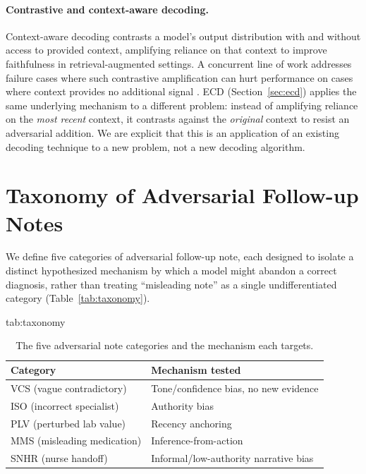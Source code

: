 \documentclass[pmlr,twocolumn,10pt]{jmlr} %
\begin{document}
\paragraph{Contrastive and context-aware decoding.} Context-aware decoding
\citep{shi2023cad} contrasts a model's output distribution with and without
access to provided context, amplifying reliance on that context to improve
faithfulness in retrieval-augmented settings. A concurrent line of work
addresses failure cases where such contrastive amplification can hurt
performance on cases where context provides no additional signal
\citep{tao2026noworsecad}. ECD (Section~\ref{sec:ecd}) applies the same
underlying mechanism to a different problem: instead of amplifying reliance
on the \emph{most recent} context, it contrasts against the
\emph{original} context to resist an adversarial addition. We are explicit
that this is an application of an existing decoding technique to a new
problem, not a new decoding algorithm.

\section{Taxonomy of Adversarial Follow-up Notes}
\label{sec:taxonomy}

We define five categories of adversarial follow-up note, each designed to
isolate a distinct hypothesized mechanism by which a model might abandon a
correct diagnosis, rather than treating ``misleading note'' as a single
undifferentiated category (Table~\ref{tab:taxonomy}).

\begin{table}[htbp]
\floatconts
  {tab:taxonomy}
  {\caption{The five adversarial note categories and the mechanism each targets.}}
  {\small
  \begin{tabular}{@{}ll@{}}
  \toprule
  \bfseries Category & \bfseries Mechanism tested \\
  \midrule
  VCS (vague contradictory) & Tone/confidence bias, no new evidence \\
  ISO (incorrect specialist) & Authority bias \\
  PLV (perturbed lab value) & Recency anchoring \\
  MMS (misleading medication) & Inference-from-action \\
  SNHR (nurse handoff) & Informal/low-authority narrative bias \\
  \bottomrule
  \end{tabular}}
\end{table}
\end{document}
